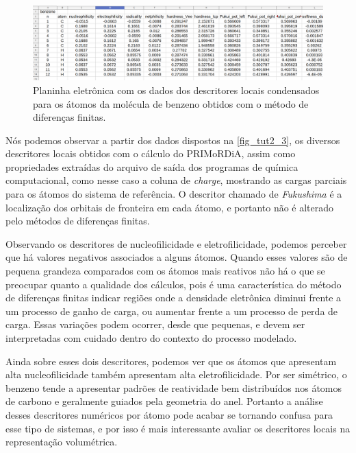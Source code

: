 \documentclass[a4paper,11pt]{refart}
\begin{document}
\hspace*{-1.2\leftmarginwidth}
\begin{minipage}{\fullwidth}
	\begin{figure}[H]
		\begin{center}
			\includegraphics[width=7in]{images/tut2_img4}
			\caption{Planinha eletrônica com os dados dos descritores locais condensados para os átomos da molécula de benzeno obtidos com o método de diferenças finitas.}
			\label{fig_tut2_3}
		\end{center}
	\end{figure}
\end{minipage}

Nós podemos observar a partir dos dados dispostos na \autoref{fig_tut2_3}, os diversos descritores locais obtidos com o cálculo do PRIMoRDiA, assim como propriedades extraídas do arquivo de saída dos programas de química computacional, como nesse caso a coluna de \emph{charge}, mostrando as cargas parciais para os átomos do sistema de referência. O descritor chamado de \emph{Fukushima} é a localização dos orbitais de fronteira em cada átomo, e portanto não é alterado pelo métodos de diferenças finitas. 

Observando os descritores de nucleofilicidade e eletrofilicidade, podemos perceber que há valores negativos associados a alguns átomos. Quando esses valores são de pequena grandeza comparados com os átomos mais reativos não há o que se preocupar quanto a qualidade dos cálculos, pois é uma característica do método de diferenças finitas indicar regiões onde a densidade eletrônica diminui frente a um processo de ganho de carga, ou aumentar frente a um processo de perda de carga. Essas variações podem ocorrer, desde que pequenas, e devem ser interpretadas com cuidado dentro do contexto do processo modelado. 

Ainda sobre esses dois descritores, podemos ver que os átomos que apresentam alta nucleofilicidade também apresentam alta eletrofilicidade. Por ser simétrico, o benzeno tende a apresentar padrões de reatividade bem distribuídos nos átomos de carbono e geralmente guiados pela geometria do anel. Portanto a análise desses descritores numéricos por átomo pode acabar se tornando confusa para esse tipo de sistemas, e por isso é mais interessante avaliar os descritores locais na representação volumétrica. 
\end{document}
